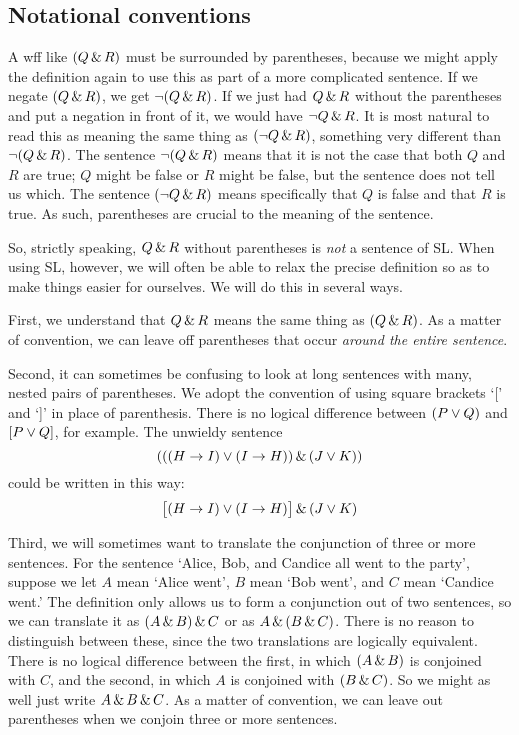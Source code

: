 \subsection{Notational conventions}
\label{SLconventions}
A wff like $(Q \,\&\, R)$ must be surrounded by parentheses, because we might apply the definition again to use this as part of a more complicated sentence. If we negate $(Q \,\&\, R)$, we get $\neg(Q \,\&\, R)$. If we just had $Q \,\&\, R$ without the parentheses and put a negation in front of it, we would have $\neg Q \,\&\, R$. It is most natural to read this as meaning the same thing as $(\neg Q \,\&\, R)$, something very different than $\neg(Q\,\&\, R)$. The sentence $\neg(Q \,\&\, R)$ means that it is not the case that both $Q$ and $R$ are true; $Q$ might be false or $R$ might be false, but the sentence does not tell us which. The sentence $(\neg Q \,\&\, R)$ means specifically that $Q$ is false and that $R$ is true. As such, parentheses are crucial to the meaning of the sentence.

So, strictly speaking, $Q \,\&\, R$ without parentheses is \emph{not} a sentence of SL. When using SL, however, we will often be able to relax the precise definition so as to make things easier for ourselves. We will do this in several ways.

First,  we understand that $Q \,\&\, R$ means the same thing as $(Q \,\&\, R)$. As a matter of convention, we can leave off parentheses that occur \emph{around the entire sentence}.

Second, it can sometimes be confusing to look at long sentences with many, nested pairs of parentheses. We adopt the convention of using square brackets `[' and `]' in place of parenthesis. There is no logical difference between $(P\vee Q)$ and $[P\vee Q]$, for example. The unwieldy sentence
$$(((H \rightarrow I) \vee (I \rightarrow H)) \,\&\, (J \vee K))$$
could be written in this way:
$$\bigl[(H \rightarrow I) \vee (I \rightarrow H)\bigr] \,\&\, (J \vee K)$$



Third, we will sometimes want to translate the conjunction of three or more sentences. For the sentence `Alice, Bob, and Candice all went to the party', suppose we let $A$ mean `Alice went', $B$ mean `Bob went', and $C$ mean `Candice went.' The definition only allows us to form a conjunction out of two sentences, so we can translate it as $(A \,\&\, B) \,\&\, C$ or as $A \,\&\, (B \,\&\, C)$. There is no reason to distinguish between these, since the two translations are logically equivalent. There is no logical difference between the first, in which $(A \,\&\, B)$ is conjoined with $C$, and the second, in which $A$ is conjoined with $(B \,\&\, C)$.  So we might as well just write $A \,\&\, B \,\&\, C$. As a matter of convention, we can leave out parentheses when we conjoin three or more sentences.

